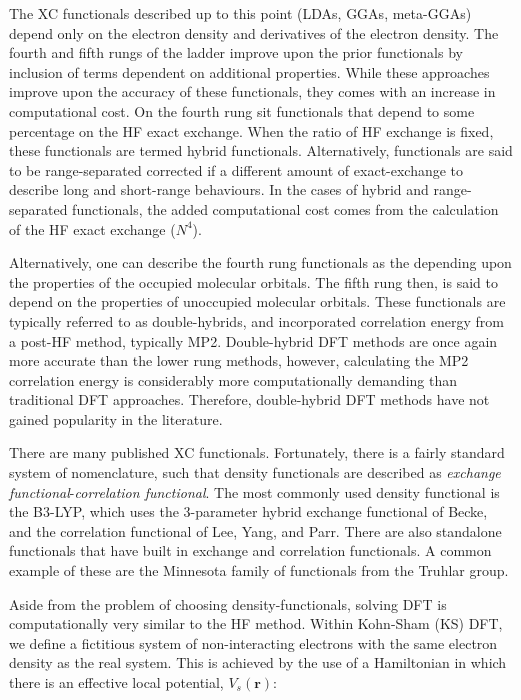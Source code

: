 \begin{doublespace}
The XC functionals described up to this point (LDAs, GGAs, meta-GGAs) depend
only on the electron density and derivatives of the electron density. The
fourth and fifth rungs of the ladder improve upon the prior functionals by
inclusion of terms dependent on additional properties. While these approaches
improve upon the accuracy of these functionals, they comes with an increase in
computational cost. On the fourth rung sit functionals that depend to some
percentage on the HF exact exchange. When the ratio of HF exchange is fixed,
these functionals are termed hybrid functionals. Alternatively, functionals are
said to be range-separated corrected if a different amount of exact-exchange to
describe long and short-range behaviours. In the cases of hybrid and
range-separated functionals, the added computational cost comes from the
calculation of the HF exact exchange ($N^4$).

Alternatively, one can describe the fourth rung functionals as the depending
upon the properties of the occupied molecular orbitals. The fifth rung then, is
said to depend on the properties of unoccupied molecular orbitals. These
functionals are typically referred to as double-hybrids, and incorporated
correlation energy from a post-HF method, typically MP2.\cite{Goerigk2014}
Double-hybrid DFT methods are once again more accurate than the lower rung
methods, however, calculating the MP2 correlation energy is considerably more
computationally demanding than traditional DFT approaches. Therefore,
double-hybrid DFT methods have not gained popularity in the literature.

There are many published XC functionals. Fortunately, there is a fairly
standard system of nomenclature, such that density functionals are described as
\emph{exchange functional}-\emph{correlation functional}. The most commonly
used density functional is the  B3-LYP, which uses the 3-parameter hybrid
exchange functional of Becke,\cite{Becke1993} and the correlation functional of
Lee, Yang, and Parr.\cite{Lee1988} There are also standalone functionals that
have built in exchange and correlation functionals. A common example of these
are the Minnesota family of functionals from the Truhlar
group.\cite{Zhao2006,Zhao2006a}

Aside from the problem of choosing density-functionals, solving DFT is
computationally very similar to the HF method. Within Kohn-Sham (KS) DFT, we
define a fictitious system of non-interacting electrons with the same electron
density as the real system. This is achieved by the use of a Hamiltonian in
which there is an effective local potential, $V_s(\mathbf{r})$:


\end{doublespace}
